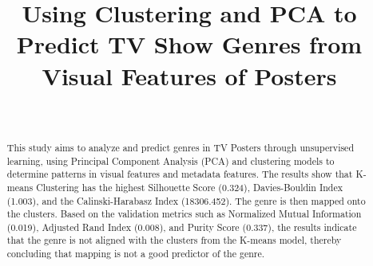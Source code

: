 \documentclass[conference]{IEEEtran}
\begin{document}
\makeatletter %
\newcommand{\linebreakand}{%
  \end{@IEEEauthorhalign}
  \hfill\mbox{}\par
  \mbox{}\hfill\begin{@IEEEauthorhalign}
}
\makeatother %

\title{Using Clustering and PCA to Predict TV Show Genres from Visual Features of Posters\\
}

\author{
\and
{}
\\
\and

}

\maketitle

\begin{abstract}
This study aims to analyze and predict genres in TV Posters through unsupervised learning, using Principal Component Analysis (PCA) and clustering models to determine patterns in visual features and metadata features. The results show that K-means Clustering has the highest Silhouette Score (0.324), Davies-Bouldin Index (1.003), and the Calinski-Harabasz Index (18306.452). The genre is then mapped onto the clusters. Based on the validation metrics such as Normalized Mutual Information (0.019), Adjusted Rand Index (0.008), and Purity Score (0.337), the results indicate that the genre is not aligned with the clusters from the K-means model, thereby concluding that mapping is not a good predictor of the genre.     
\end{abstract}
\end{document}
